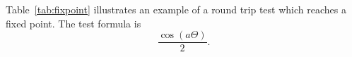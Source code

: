 




Table~\ref{tab:fixpoint} illustrates an example of a round trip test which reaches a fixed point. The test formula is
\begin{equation}
\frac{\cos\left(a\Theta\right)}{2}.
\end{equation}

